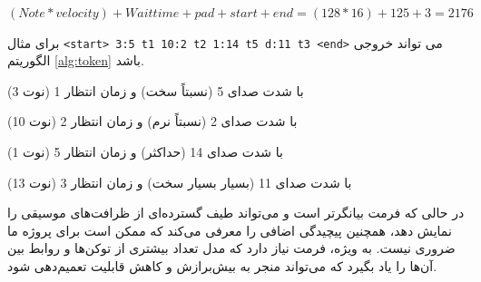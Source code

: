 $ (Note * velocity) + Wait  time + pad + start + end =(128 * 16) + 125 + 3 = 2176$
\begin{example}[]
      \centering
      \label{example:token}
      برای مثال \texttt{<start> 3:5 t1  10:2 t2  1:14 t5  d:11 t3 <end>} می تواند خروجی الگوریتم \ref{alg:token} باشد.

       (نوت 3) با شدت صدای 5 (نسبتاً سخت) و زمان انتظار 1

       (نوت 10) با شدت صدای 2 (نسبتاً نرم) و زمان انتظار 2

       (نوت 1) با شدت صدای 14 (حداکثر) و زمان انتظار 5

       (نوت 13) با شدت صدای 11 (بسیار بسیار سخت) و زمان انتظار 3
\end{example}

در حالی که فرمت  بیانگرتر است و می‌تواند طیف گسترده‌ای از ظرافت‌های
موسیقی را نمایش دهد، همچنین پیچیدگی اضافی را معرفی می‌کند  که ممکن است
برای پروژه ما ضروری نیست. به ویژه، فرمت  نیاز دارد که مدل تعداد
بیشتری از توکن‌ها و روابط بین آن‌ها را یاد بگیرد که می‌تواند منجر به
بیش‌برازش و کاهش قابلیت تعمیم‌دهی شود.



